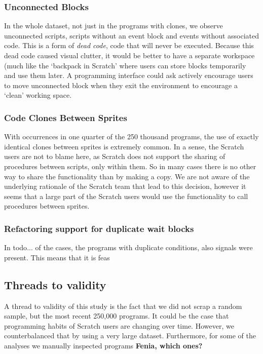 \documentclass{sig-alternate}
\newcommand{\todo}[1]{\textbf{#1}}
\begin{document}
\subsubsection{Unconnected Blocks}
In the whole dataset, not just in the programs with clones, we observe unconnected scripts, scripts without an event block and events without associated code. This is a form of \emph{dead code}, code that will never be executed. Because this dead code caused visual clutter, it would be better to have a separate workspace (much like the `backpack in Scratch' where users can store blocks temporarily and use them later. A programming interface could ask actively encourage users to move unconnected block when they exit the environment to encourage a `clean' working space. 

\subsubsection{Code Clones Between Sprites}
With occurrences in one quarter of the 250 thousand programs, the use of exactly identical clones between sprites is extremely common. In a sense, the Scratch users are not to blame here, as Scratch does not support the sharing of procedures between scripts, only within them. So in many cases there is no other way to share the functionality than by making a copy. We are not aware of the underlying rationale of the Scratch team that lead to this decision, however it seems that a large part of the Scratch users would use the functionality to call procedures between sprites.

\subsubsection{Refactoring support for duplicate wait blocks}
In todo{...} of the cases, the programs with duplicate conditions, also signals were present. This means that it is feas

\subsection{Threads to validity}
A thread to validity of this study is the fact that we did not scrap a random sample, but the most recent 250,000 programs. It could be the case that programming habits of Scratch users are changing over time. However, we counterbalanced that by using a very large dataset. Furthermore, for some of the analyses we manually inspected programs \todo{Fenia, which ones?}
\end{document}
